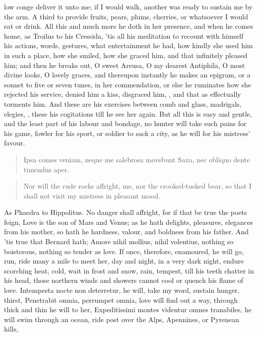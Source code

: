 low conge deliver it unto me; if I would walk, another was ready to
sustain me by the arm. A third to provide fruits, pears, plums,
cherries, or whatsoever I would eat or drink. All this and much more he
doth in her presence, and when he comes home, as Troilus to his
Cressida, 'tis all his meditation to recount with himself his actions,
words, gestures, what entertainment he had, how kindly she used him in
such a place, how she smiled, how she graced him, and that infinitely
pleased him; and then he breaks out, O sweet Areusa, O my dearest
Antiphila, O most divine looks, O lovely graces, and thereupon
instantly he makes an epigram, or a sonnet to five or seven tunes, in
her commendation, or else he ruminates how she rejected his service,
denied him a kiss, disgraced him, \etc{}, and that as effectually torments
him. And these are his exercises between comb and glass, madrigals,
elegies, \etc{}, these his cogitations till he see her again. But all this
is easy and gentle, and the least part of his labour and bondage, no
hunter will take such pains for his game, fowler for his sport, or
soldier to sack a city, as he will for his mistress' favour.

\begin{latin}
\begin{verse}
Ipsa comes veniam, neque me salebrosa movebunt
Saxa, nec obliquo dente timendus aper.
\end{verse}
\end{latin}
\translationrule%
\begin{verse}%
Nor will the rude rocks affright, me,
nor the crooked-tusked bear,
so that I shall not visit my mistress in pleasant mood.
\end{verse}%

As Phaedra to Hippolitus. No danger shall affright, for if that be true
the poets feign, Love is the son of Mars and Venus; as he hath
delights, pleasures, elegances from his mother, so hath he hardness,
valour, and boldness from his father. And 'tis true that Bernard hath;
Amore nihil mollius, nihil volentius, nothing so boisterous, nothing so
tender as love. If once, therefore, enamoured, he will go, run, ride
many a mile to meet her, day and night, in a very dark night, endure
scorching heat, cold, wait in frost and snow, rain, tempest, till his
teeth chatter in his head, those northern winds and showers cannot cool
or quench his flame of love. Intempesta nocte non deterretur, he will,
take my word, sustain hunger, thirst, Penetrabit omnia, perrumpet
omnia, love will find out a way, through thick and thin he will to her,
Expeditissimi montes videntur omnes tranabiles, he will swim through an
ocean, ride post over the Alps, Apennines, or Pyrenean hills,

